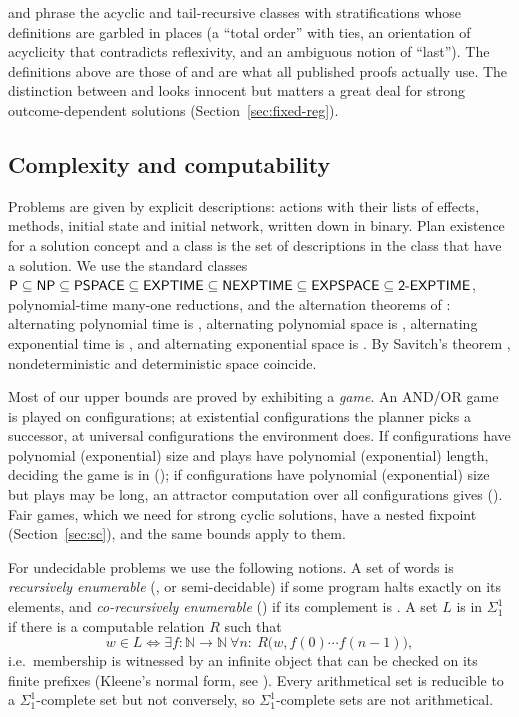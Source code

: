 \CBa{} and \CBb{} phrase the acyclic and tail-recursive classes with stratifications whose
definitions are garbled in places (a ``total order'' with ties, an orientation of acyclicity that
contradicts reflexivity, and an ambiguous notion of ``last''). The definitions above are those of
\textcite{alford:et:al:icaps-15} and are what all published proofs actually use. The distinction
between \REG{} and \REGtn{} looks innocent but matters a great deal for strong outcome-dependent
solutions (Section~\ref{sec:fixed-reg}).

\subsection{Complexity and computability}

Problems are given by explicit descriptions: actions with their lists of effects, methods,
initial state and initial network, written down in binary. Plan existence for a solution
concept and a class is the set of descriptions in the class that have a solution. We use the
standard classes $\textsf{P}\subseteq\textsf{NP}\subseteq\textsf{PSPACE}\subseteq\textsf{EXPTIME}\subseteq\textsf{NEXPTIME}\subseteq
\textsf{EXPSPACE}\subseteq\textsf{2-EXPTIME}$, polynomial-time many-one reductions, and the alternation theorems of
\textcite{chandra:et:al:jacm-81}: alternating polynomial time is \PSPACE, alternating polynomial
space is \EXPTIME, alternating exponential time is \EXPSPACE, and alternating exponential space is
\TWOEXP. By Savitch's theorem \parencite{savitch:jcss-70}, nondeterministic and deterministic
space coincide.

Most of our upper bounds are proved by exhibiting a \emph{game}. An AND/OR game is played on
configurations; at existential configurations the planner picks a successor, at universal
configurations the environment does. If configurations have polynomial (exponential) size and
plays have polynomial (exponential) length, deciding the game is in \PSPACE{} (\EXPSPACE{}); if
configurations have polynomial (exponential) size but plays may be long, an attractor computation
over all configurations gives \EXPTIME{} (\TWOEXP). Fair games, which we need for strong cyclic
solutions, have a nested fixpoint (Section~\ref{sec:sc}), and the same bounds apply to them.

For undecidable problems we use the following notions. A set of words is \emph{recursively
enumerable} (\RE, or semi-decidable) if some program halts exactly on its elements, and
\emph{co-recursively enumerable} (\coRE) if its complement is \RE. A set $L$ is in
$\Sigma^1_1$ if there is a computable relation $R$ such that
\[
  w\in L \iff \exists f:\mathbb N\to\mathbb N\ \forall n:\ R\bigl(w, f(0)\cdots f(n-1)\bigr),
\]
i.e.\ membership is witnessed by an infinite object that can be checked on its finite prefixes
(Kleene's normal form, see \textcite{rogers:67}). Every arithmetical set is reducible to a
$\Sigma^1_1$-complete set but not conversely, so $\Sigma^1_1$-complete sets are not arithmetical.

